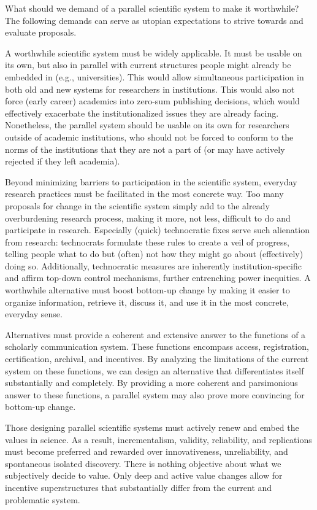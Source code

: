 \documentclass[a5paper]{book}
\begin{document}
What should we demand of a parallel scientific system to make it
worthwhile? The following demands can serve as utopian expectations to
strive towards and evaluate proposals.

A worthwhile scientific system must be widely applicable. It must be
usable on its own, but also in parallel with current structures people
might already be embedded in (e.g., universities). This would allow
simultaneous participation in both old and new systems for researchers
in institutions. This would also not force (early career) academics into
zero-sum publishing decisions, which would effectively exacerbate the
institutionalized issues they are already facing. Nonetheless, the
parallel system should be usable on its own for researchers outside of
academic institutions, who should not be forced to conform to the norms
of the institutions that they are not a part of (or may have actively
rejected if they left academia).

Beyond minimizing barriers to participation in the scientific system,
everyday research practices must be facilitated in the most concrete
way. Too many proposals for change in the scientific system simply add
to the already overburdening research process, making it more, not less,
difficult to do and participate in research. Especially (quick)
technocratic fixes serve such alienation from research: technocrats
formulate these rules to create a veil of progress, telling people what
to do but (often) not how they might go about (effectively) doing so.
Additionally, technocratic measures are inherently institution-specific
and affirm top-down control mechanisms, further entrenching power
inequities. A worthwhile alternative must boost bottom-up change by
making it easier to organize information, retrieve it, discuss it, and
use it in the most concrete, everyday sense.

Alternatives must provide a coherent and extensive answer to the
functions of a scholarly communication system. These functions encompass
access, registration, certification, archival, and incentives. By
analyzing the limitations of the current system on these functions, we
can design an alternative that differentiates itself substantially and
completely. By providing a more coherent and parsimonious answer to
these functions, a parallel system may also prove more convincing for
bottom-up change.

Those designing parallel scientific systems must actively renew and
embed the values in science. As a result, incrementalism, validity,
reliability, and replications must become preferred and rewarded over
innovativeness, unreliability, and spontaneous isolated discovery. There
is nothing objective about what we subjectively decide to value. Only
deep and active value changes allow for incentive superstructures that
substantially differ from the current and problematic system.
\end{document}
